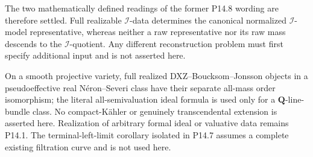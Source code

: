 The two mathematically defined readings of the former P14.8 wording are
therefore settled.  Full realizable \(\mathcal I\)-data determines the
canonical normalized \(\mathcal I\)-model representative, whereas neither a
raw representative nor its raw mass descends to the
\(\mathcal I\)-quotient.  Any different reconstruction problem must first
specify additional input and is not asserted here.

On a smooth projective variety, full realized DXZ--Boucksom--Jonsson objects
in a pseudoeffective real N\'eron--Severi class have their separate all-mass
order isomorphism; the literal all-semivaluation ideal formula is used only
for a \(\mathbf Q\)-line-bundle class.  No compact-K\"ahler or genuinely
transcendental extension is asserted here.  Realization of arbitrary formal
ideal or valuative data remains P14.1.  The terminal-left-limit corollary
isolated in P14.7 assumes a complete existing filtration curve and is not
used here.
